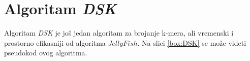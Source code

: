 \documentclass[12pt,oneside]{memoir}
\begin{document}
\begin{comment}

Na listingu \ref{lst:106} se može videti konkretan primer izvršavanja algoritma u komandnom promptu.



Za kompajliranje fajla u kome se nalazi algoritam i pokretanje interaktivnog Elixir-a, navodi se komanda \textit{iex jellyfish.ex}. Nakon toga mogu se pozivati funkcije tako što se prvo navede ime modula u okviru koga su definisane, tačka, pa naziv funkcije i njeni argumenti. U ovom slučaju to su modul \textit{JellyFish}, funkcija \textit{jellyfish\_algorithm}, lista stringova $["AC", "CG", "AC", "GT", "CA","GG", "AC",\\"GT"]$ koji predstavljaju k-mere i faktor opterećenja 0.7.

\end{comment}

\section{Algoritam \textit{DSK}}
\label{odeljak:DSK}

Algoritam \textit{DSK} je još jedan algoritam za brojanje k-mera, ali vremenski i prostorno efikasniji od algoritma $JellyFish$. Na slici \ref{box:DSK} se može videti pseudokod ovog algoritma.

\begin{comment}

\begin{figure}[h]
\centering
\texttt{[image: DSK5\_11.PNG]}
\caption{DSK algoritam \cite{WingKinSung}}
\label{fig:DSK}
\end{figure}

\end{comment}
\end{document}
